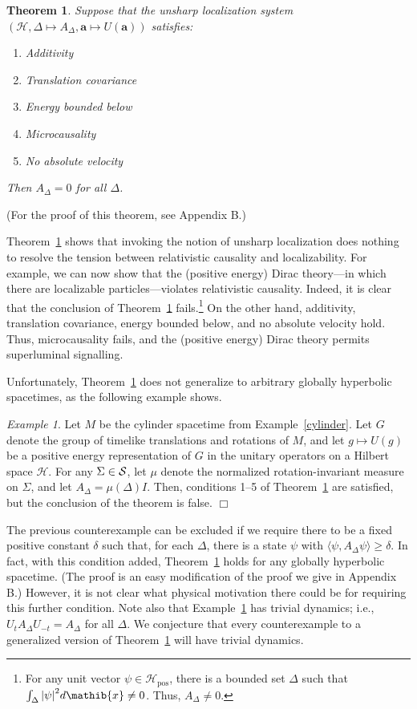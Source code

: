 \documentclass[12pt]{article}
\newtheorem{thm}{Theorem}
\theoremstyle{remark}
\newtheorem{example}{Example}
\newcommand{\abs}[1]{\mbox{$|#1|$}}
\newcommand{\hil}[1]{\mathcal{#1}}
\begin{document}
\begin{thm} Suppose that the unsharp localization system $(\hil{H},\Delta \mapsto
  A_{\Delta},\mathbf{a}\mapsto U(\mathbf{a}))$ satisfies:
  \begin{enumerate}
  \item Additivity 
  \item Translation covariance
  \item Energy bounded below
  \item Microcausality
  \item No absolute velocity
  \end{enumerate} Then $A_{\Delta}=0$ for all $\Delta$.  \label{pov}
\end{thm}
\noindent (For the proof of this theorem, see Appendix B.)  

Theorem~\ref{pov} shows that invoking the notion of unsharp
localization does nothing to resolve the tension between relativistic
causality and localizability.  For example, we can now show that the
(positive energy) Dirac theory---in which there are localizable
particles---violates relativistic causality.  Indeed, it is clear that
the conclusion of Theorem~\ref{pov} fails.\footnote{For any unit
  vector $\psi \in \hil{H}_{\mathrm{pos}}$, there is a bounded set
  $\Delta$ such that $\int _{\Delta}\abs{\psi}^{2}d\mathib{x}\neq 0$.
  Thus, $A_{\Delta}\neq 0$.}  On the other hand, additivity,
translation covariance, energy bounded below, and no absolute velocity
hold.  Thus, microcausality fails, and the (positive energy) Dirac
theory permits superluminal signalling.

Unfortunately, Theorem~\ref{pov} does not generalize to arbitrary
globally hyperbolic spacetimes, as the following example shows.
\begin{example} Let $M$ be the cylinder spacetime from
  Example~\ref{cylinder}.  Let $G$ denote the group of timelike
  translations and rotations of $M$, and let $g\mapsto U(g)$ be a
  positive energy representation of $G$ in the unitary operators on a
  Hilbert space $\hil{H}$.  For any $\Sigma \in \cal{S}$, let $\mu$
  denote the normalized rotation-invariant measure on $\Sigma$, and
  let $A_{\Delta}=\mu (\Delta )I$.  Then, conditions 1--5 of
  Theorem~\ref{pov} are satisfied, but the conclusion of the theorem
  is false.  \hfill $\Box$ \label{measure}
\end{example}

The previous counterexample can be excluded if we require there to be
a fixed positive constant $\delta$ such that, for each $\Delta$, there
is a state $\psi$ with $\langle \psi ,A_{\Delta}\psi \rangle \geq
\delta$.  In fact, with this condition added, Theorem~\ref{pov} holds
for any globally hyperbolic spacetime.  (The proof is an easy
modification of the proof we give in Appendix B.)  However, it is not
clear what physical motivation there could be for requiring this
further condition.  Note also that Example~\ref{measure} has trivial
dynamics; i.e., $U_{t}A_{\Delta}U_{-t}=A_{\Delta}$ for all $\Delta$.
We conjecture that every counterexample to a generalized version of
Theorem~\ref{pov} will have trivial dynamics.
\end{document}
